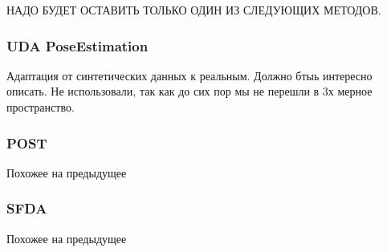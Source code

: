 НАДО БУДЕТ ОСТАВИТЬ ТОЛЬКО ОДИН ИЗ СЛЕДУЮЩИХ МЕТОДОВ.

\subsubsection*{UDA PoseEstimation}

Адаптация от синтетических данных к реальным. Должно бтыь интересно описать. Не использовали, так как до сих пор мы не перешли в 3х мерное пространство.

\subsubsection*{POST}

Похожее на предыдущее

\subsubsection*{SFDA}

Похожее на предыдущее


\newpage
